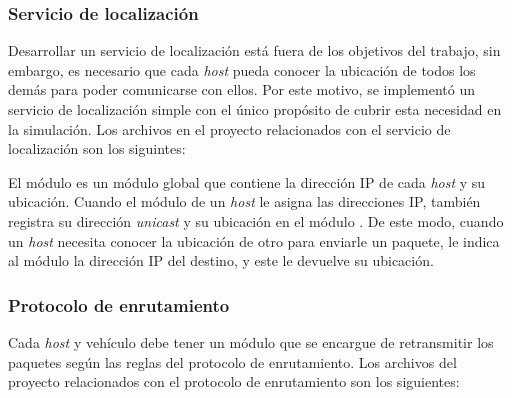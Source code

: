 
\subsubsection{Servicio de localización}

\label{subsubsec:servicio_de_localizacion_sim}

Desarrollar un servicio de localización está fuera de los objetivos del
trabajo, sin embargo, es necesario que cada \textit{host} pueda conocer la
ubicación de todos los demás para poder comunicarse con ellos. Por este motivo,
se implementó un servicio de localización simple con el único propósito de
cubrir esta necesidad en la simulación. Los archivos en el proyecto
relacionados con el servicio de localización son los siguintes:


\begin{sloppypar}
El módulo  es un módulo global que contiene la
dirección IP de cada \textit{host} y su ubicación. Cuando el módulo
 de un \textit{host} le asigna las direcciones IP,
también registra su dirección \textit{unicast} y su ubicación en el módulo
. De este modo, cuando un \textit{host} necesita
conocer la ubicación de otro para enviarle un paquete, le indica al módulo
 la dirección IP del destino, y este le devuelve su
ubicación.
\end{sloppypar}


\subsubsection{Protocolo de enrutamiento}

\label{subsubsec:protocolo_de_enrutamiento_sim}

Cada \textit{host} y vehículo debe tener un módulo que se encargue de
retransmitir los paquetes según las reglas del protocolo de enrutamiento. Los
archivos del proyecto relacionados con el protocolo de enrutamiento son los
siguientes:


